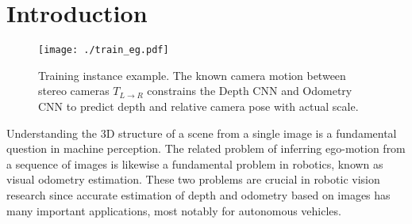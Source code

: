 \documentclass[10pt,twocolumn,letterpaper]{article}
\begin{document}
\section{Introduction} \label{sec:intro}

\begin{figure}[h] 
\centering
    \texttt{[image: ./train\_eg.pdf]}
    \caption{Training instance example. The known camera motion between stereo cameras $T_{L \rightarrow R}$ constrains the Depth CNN and Odometry CNN to predict depth and relative camera pose with actual scale.
    }\label{fig:train_eg}
\end{figure}


Understanding the 3D structure of a scene from a single image is a fundamental question in machine perception. 
The related problem of inferring ego-motion from a sequence of images is likewise a fundamental problem in robotics, known as visual odometry estimation.
These two problems are crucial in robotic vision research since accurate estimation of depth and odometry based on images has many important applications, most notably for autonomous vehicles.
\end{document}
